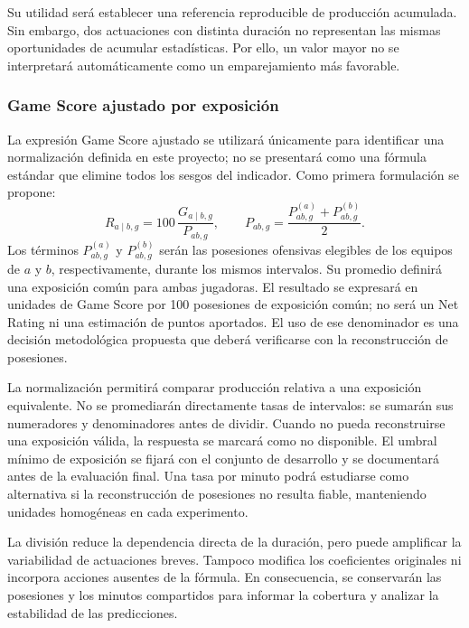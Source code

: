 Su utilidad será establecer una referencia reproducible de producción acumulada. Sin embargo, dos actuaciones con distinta duración no representan las mismas oportunidades de acumular estadísticas. Por ello, un valor mayor no se interpretará automáticamente como un emparejamiento más favorable.

\subsubsection*{Game Score ajustado por exposición}
La expresión Game Score ajustado se utilizará únicamente para identificar una normalización definida en este proyecto; no se presentará como una fórmula estándar que elimine todos los sesgos del indicador. Como primera formulación se propone:
\begin{equation}
R_{a\mid b,g}=100\,\frac{G_{a\mid b,g}}{P_{ab,g}},
\qquad
P_{ab,g}=\frac{P^{(a)}_{ab,g}+P^{(b)}_{ab,g}}{2}.
\label{eq:gmsc-normalizado-615}
\end{equation}
Los términos $P^{(a)}_{ab,g}$ y $P^{(b)}_{ab,g}$ serán las posesiones ofensivas elegibles de los equipos de $a$ y $b$, respectivamente, durante los mismos intervalos. Su promedio definirá una exposición común para ambas jugadoras. El resultado se expresará en unidades de Game Score por 100 posesiones de exposición común; no será un Net Rating ni una estimación de puntos aportados. El uso de ese denominador es una decisión metodológica propuesta que deberá verificarse con la reconstrucción de posesiones.

La normalización permitirá comparar producción relativa a una exposición equivalente. No se promediarán directamente tasas de intervalos: se sumarán sus numeradores y denominadores antes de dividir. Cuando no pueda reconstruirse una exposición válida, la respuesta se marcará como no disponible. El umbral mínimo de exposición se fijará con el conjunto de desarrollo y se documentará antes de la evaluación final. Una tasa por minuto podrá estudiarse como alternativa si la reconstrucción de posesiones no resulta fiable, manteniendo unidades homogéneas en cada experimento.

La división reduce la dependencia directa de la duración, pero puede amplificar la variabilidad de actuaciones breves. Tampoco modifica los coeficientes originales ni incorpora acciones ausentes de la fórmula. En consecuencia, se conservarán las posesiones y los minutos compartidos para informar la cobertura y analizar la estabilidad de las predicciones.


